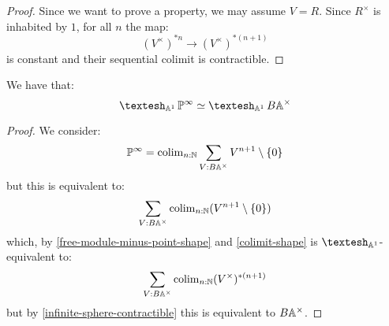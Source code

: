 \begin{proof}
Since we want to prove a property, we may assume $V=R$. Since $R^\times$ is inhabited by $1$, for all $n$ the map:
\[(V^\times)^{*n} \to (V^\times)^{*(n+1)}\]
is constant and their sequential colimit is contractible.
\end{proof}

\begin{proposition}
We have that:
\[\shape_{\A^1} \bP^\infty \simeq \shape_{\A^1} B\A^\times\]
\end{proposition}

\begin{proof}
We consider:
\[\mathbb{P}^\infty = \mathrm{colim}_{n:\mathbb{N}} \sum_{V:B\mathbb{A}^\times} V^{n+1}\setminus\{0\}\]
but this is equivalent to:
\[ \sum_{V:B\mathbb{A}^\times}\mathrm{colim}_{n:\mathbb{N}} (V^{n+1}\setminus\{0\}) \]
which, by \cref{free-module-minus-point-shape} and \cref{colimit-shape} is $\shape_{\A^1}$-equivalent to:
\[ \sum_{V:B\mathbb{A}^\times}\mathrm{colim}_{n:\mathbb{N}} (V^\times)^{*(n+1)}\]
but by \cref{infinite-sphere-contractible} this is equivalent to $B\mathbb{A}^\times$.
\end{proof}